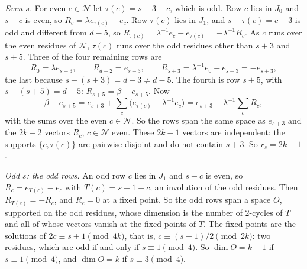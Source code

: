 \begin{informalproof}
\emph{Even $s$.} For even $c\in\mathcal N$ let $\tau(c)=s+3-c$, which is odd. Row $c$ lies in $J_0$ and $s-c$ is even, so
$R_c=\lambda e_{\tau(c)}-e_c$. Row $\tau(c)$ lies in $J_1$, and $s-\tau(c)=c-3$ is odd and different from $d-5$, so
$R_{\tau(c)}=\lambda^{-1}e_c-e_{\tau(c)}=-\lambda^{-1}R_c$. As $c$ runs over the even residues of $\mathcal N$,
$\tau(c)$ runs over the odd residues other than $s+3$ and $s+5$. Three of the four remaining rows are
\[
  R_0=\lambda e_{s+3},\qquad R_{d-2}=e_{s+3},\qquad R_{s+3}=\lambda^{-1}e_0-e_{s+3}=-e_{s+3},
\]
the last because $s-(s+3)=d-3\ne d-5$. The fourth is row $s+5$, with $s-(s+5)=d-5$: $R_{s+5}=\beta-e_{s+5}$. Now
\[
  \beta-e_{s+5}=e_{s+3}+\sum_c\bigl(e_{\tau(c)}-\lambda^{-1}e_c\bigr)=e_{s+3}+\lambda^{-1}\sum_cR_c ,
\]
with the sums over the even $c\in\mathcal N$. So the rows span the same space as $e_{s+3}$ and the $2k-2$ vectors
$R_c$, $c\in\mathcal N$ even. These $2k-1$ vectors are independent: the supports $\{c,\tau(c)\}$ are pairwise disjoint
and do not contain $s+3$. So $r_s=2k-1$.

\emph{Odd $s$: the odd rows.} An odd row $c$ lies in $J_1$ and $s-c$ is even, so $R_c=e_{T(c)}-e_c$ with $T(c)=s+1-c$,
an involution of the odd residues. Then $R_{T(c)}=-R_c$, and $R_c=0$ at a fixed point. So the odd rows span a space
$O$, supported on the odd residues, whose dimension is the number of $2$-cycles of $T$ and all of whose vectors
vanish at the fixed points of $T$. The fixed points are the solutions of $2c\equiv s+1\pmod{4k}$, that is,
$c\equiv(s+1)/2\pmod{2k}$: two residues, which are odd if and only if $s\equiv1\pmod4$. So
$\dim O=k-1$ if $s\equiv1\pmod4$, and $\dim O=k$ if $s\equiv3\pmod4$.


\end{informalproof}
